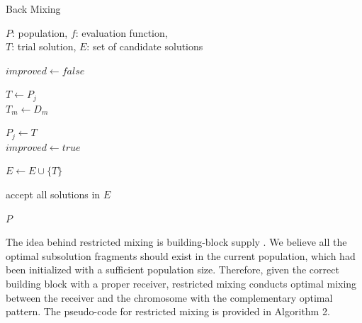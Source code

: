 \documentclass{sig-alternate-05-2015}
\begin{document}
\begin{algorithm}
\caption{Back Mixing}\label{algo_disjdecomp}

$P$: population, $f$: evaluation function, \\
$T$: trial solution, $E$: set of candidate solutions 


\BlankLine

$improved  \leftarrow false$ \\
 {

    $T \leftarrow P_j$ \\
     {
        $T_m \leftarrow D_m$ \\
    }

     {

        $P_j \leftarrow T$ \\
        $improved  \leftarrow true$ \\
    }{
         {
            $E \leftarrow E \cup \{T\}$ \\
        }
    }
}
 {
    accept all solutions in $E$ \\
} 

\Return $P$

\end{algorithm} 

The idea behind restricted mixing is building-block supply \cite{goldberg:buildingblock}. We believe all the optimal subsolution fragments should exist in the current population, which had been initialized with a sufficient population size. Therefore, given the correct building block with a proper receiver, restricted mixing conducts optimal mixing between the receiver and the chromosome with the complementary optimal pattern. The pseudo-code for  restricted mixing is provided in Algorithm 2.
\end{document}
